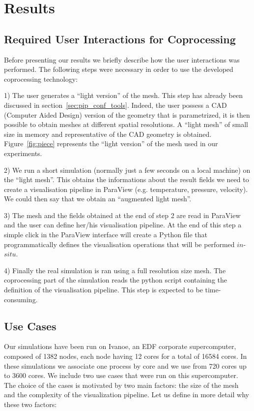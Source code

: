 \section{Results}
\label{sec:results}

\subsection{Required User Interactions for Coprocessing}
Before presenting our results we briefly describe how the user interactions was
performed. The following steps were necessary in order to use the developed
coprocessing technology:


1) The user generates a ``light version'' of the mesh. This step has already been
discussed in section~\ref{sec:pip_conf_tools}. Indeed, the user possess a CAD (Computer Aided
Design) version of the geometry that is parametrized, it is then possible to
obtain meshes at different spatial resolutions. A ``light mesh'' of small size in
memory and representative of the CAD geometry is obtained. Figure~\ref{fig:piece} represents
the ``light version'' of the mesh used in our experiments.


2) We run a short simulation (normally just a few seconds on a local machine) on the ``light mesh''.
This obtains the informations about the result fields we need to create a
visualisation pipeline in ParaView (e.g. temperature, pressure, velocity). We
could then say that we obtain an ``augmented light mesh''.


3) The mesh and the fields obtained at the end of step 2 are read in ParaView
and the user can define her/his visualisation pipeline. At the end of this step
a simple click in the ParaView interface will create a Python file that
programmatically defines the visualisation operations that will be performed
$in$-$situ$.


4) Finally the real simulation is ran using a full resolution size mesh. The
coprocessing part of the simulation reads the python script containing the
definition of the visualisation pipeline. This step is expected to be
time-consuming.

\subsection{Use Cases}


Our simulations have been run on Ivanoe, an EDF corporate supercomputer,
composed of 1382 nodes, each node having 12 cores for a total of 16584 cores. In
these simulations we associate one process by core and we use from 720 cores up
to 3600 cores. We include two use cases that were run on this supercomputer. The
choice of the cases is motivated by two main factors: the size of the mesh and
the complexity of the visualization pipeline. Let us define in more detail why
these two factors:

